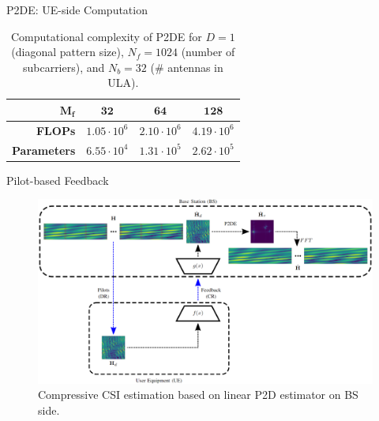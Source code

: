 \documentclass{beamer}
\begin{document}
  \begin{frame}{P2DE: UE-side Computation}
    \begin{table}[!h]
      \caption{Computational complexity of P2DE for $D=1$ (diagonal pattern size), $N_f=1024$ (number of subcarriers), and $N_b=32$ (\# antennas in ULA).}
      \begin{center}
      \label{tab:p2de-comp} 
      \begin{tabular}{|r|c|c|c|}
      \hline
      $\mathbf{M_f}$      & $\mathbf{32}$      & $\mathbf{64}$       & $\mathbf{128}$     \\ \hline
      \textbf{FLOPs}      & $1.05\cdot 10^{6}$ & $2.10\cdot 10^{6}$  & $4.19\cdot 10^{6}$ \\ \hline
      \textbf{Parameters} & $6.55\cdot 10^{4}$ & $1.31\cdot 10^{5}$  & $2.62\cdot 10^{5}$  \\ \hline
      \end{tabular}
      \end{center}
      \vspace*{-0.3mm}
    \end{table}
  \end{frame}

  \begin{frame}{Pilot-based Feedback}
    \begin{figure}[!hbtp]
      \centering
      \includegraphics[width=\linewidth]{01_downlink_p2d_direct_feedback_horiz_diag.png}
      \caption{Compressive CSI estimation based on linear P2D estimator on BS side. 
      }
      \label{fig:p2d_direct}
    \end{figure}
  \end{frame}
\end{document}
